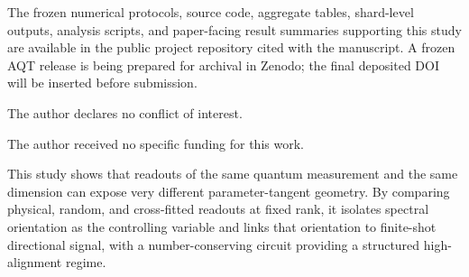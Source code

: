 \documentclass[ASNA,twocolumn]{USG}
\begin{document}
The frozen numerical protocols, source code, aggregate tables, shard-level outputs, analysis scripts, and paper-facing result summaries supporting this study are available in the public project repository cited with the manuscript. A frozen AQT release is being prepared for archival in Zenodo; the final deposited DOI will be inserted before submission.

The author declares no conflict of interest.

The author received no specific funding for this work.

This study shows that readouts of the same quantum measurement and the same dimension can expose very different parameter-tangent geometry. By comparing physical, random, and cross-fitted readouts at fixed rank, it isolates spectral orientation as the controlling variable and links that orientation to finite-shot directional signal, with a number-conserving circuit providing a structured high-alignment regime.
\end{document}
